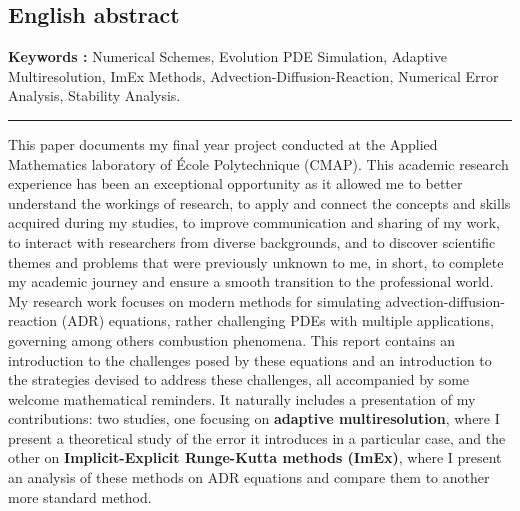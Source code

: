 \subsection*{English abstract}
    \textbf{Keywords  :} Numerical Schemes, Evolution PDE Simulation, Adaptive Multiresolution, ImEx Methods,
    Advection-Diffusion-Reaction, Numerical Error Analysis, Stability Analysis.\par
    \noindent\rule{\textwidth}{0.4pt}
    This paper documents my final year project conducted at the Applied Mathematics laboratory of École Polytechnique (CMAP).
    This academic research experience has been an exceptional opportunity as it allowed me to better understand the workings of research,
    to apply and connect the concepts and skills acquired during my studies, to improve communication and sharing of my work,
    to interact with researchers from diverse backgrounds,
    and to discover scientific themes and problems that were previously unknown to me, in short, to complete my academic journey and ensure a smooth transition to the professional world.
    My research work focuses on modern methods for simulating advection-diffusion-reaction (ADR) equations, rather challenging PDEs
    with multiple applications, governing among others combustion phenomena. This report contains an introduction to the challenges posed by these equations and
    an introduction to the strategies devised to address these challenges, all accompanied by some welcome mathematical reminders.
    It naturally includes a presentation of my contributions: two studies, one focusing on \textbf{adaptive multiresolution},
    where I present a theoretical study of the error it introduces in a particular case,
    and the other on \textbf{Implicit-Explicit Runge-Kutta methods (ImEx)},
    where I present an analysis of these methods on ADR equations and compare them to another more standard method.
\newpage